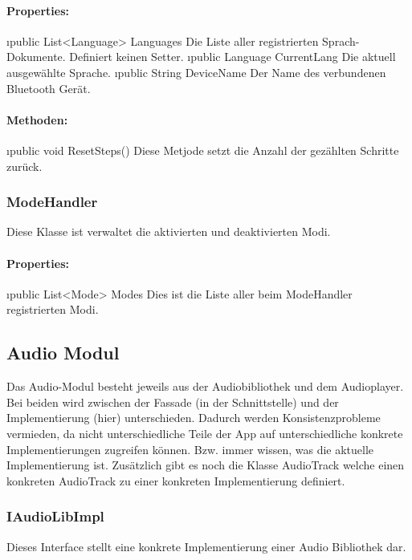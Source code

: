\documentclass[../entwurf.tex]{subfiles}
\begin{document}
				\paragraph{Properties:}
					\begin{itemize}
						\i{public List<Language> Languages} Die Liste aller registrierten Sprach-Dokumente. Definiert keinen Setter.
						\i{public Language CurrentLang} Die aktuell ausgewählte Sprache.
						\i{public String DeviceName} Der Name des verbundenen Bluetooth Gerät.
					\end{itemize}
				\paragraph{Methoden:}
					\begin{itemize}
						\i{public void ResetSteps()} Diese Metjode setzt die Anzahl der gezählten Schritte zurück.
					\end{itemize}
			\subsubsection{ModeHandler}
				Diese Klasse ist verwaltet die aktivierten und deaktivierten Modi.
				\paragraph{Properties:}
					\begin{itemize}
						\i{public List<Mode> Modes} Dies ist die Liste aller beim ModeHandler registrierten Modi.
					\end{itemize}
		\subsection{Audio Modul}
			Das Audio-Modul besteht jeweils aus der Audiobibliothek und dem Audioplayer.
			Bei beiden wird zwischen der Fassade (in der Schnittstelle) und der Implementierung (hier) unterschieden.
			Dadurch werden Konsistenzprobleme vermieden, da nicht unterschiedliche Teile der App auf unterschiedliche konkrete Implementierungen
			zugreifen können. Bzw. immer wissen, was die aktuelle Implementierung ist.
			Zusätzlich gibt es noch die Klasse AudioTrack welche einen konkreten AudioTrack zu einer konkreten Implementierung definiert.
			\subsubsection{IAudioLibImpl}
				Dieses Interface stellt eine konkrete Implementierung einer Audio Bibliothek dar.
\end{document}
